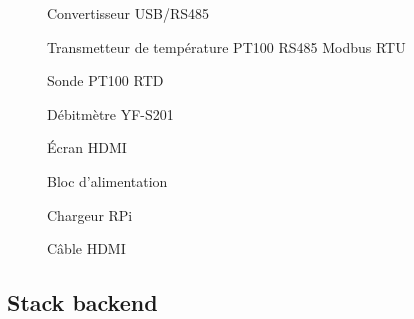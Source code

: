 \begin{figure}[htbp]
  \centering
  \caption{Convertisseur USB/RS485}
  \label{fig:photo_usb485}
\end{figure}

\begin{figure}[htbp]
  \centering
  \caption{Transmetteur de température PT100 RS485 Modbus RTU}
  \label{fig:photo_transmitter}
\end{figure}

\begin{figure}[htbp]
  \centering
  \caption{Sonde PT100 RTD}
  \label{fig:photo_pt100}
\end{figure}

\begin{figure}[htbp]
  \centering
  \caption{Débitmètre YF-S201}
  \label{fig:photo_yfs201}
\end{figure}

\begin{figure}[htbp]
  \centering
  \caption{Écran HDMI}
  \label{fig:photo_screen}
\end{figure}

\begin{figure}[htbp]
  \centering
  \caption{Bloc d'alimentation}
  \label{fig:photo_power}
\end{figure}

\begin{figure}[htbp]
  \centering
  \caption{Chargeur RPi}
  \label{fig:photo_charger}
\end{figure}

\begin{figure}[htbp]
  \centering
  \caption{Câble HDMI}
  \label{fig:photo_hdmi}
\end{figure}

\subsection{Stack backend}

